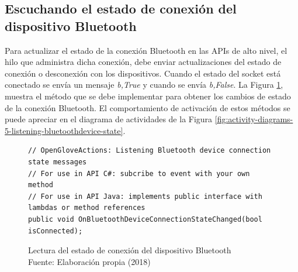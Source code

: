 \subsection{Escuchando el estado de conexión del dispositivo Bluetooth}
\label{subsection:reading-bluetooth-device-state}

Para actualizar el estado de la conexión Bluetooth en las APIs de alto nivel, el hilo que administra dicha conexión, debe enviar  actualizaciones del estado de conexión o desconexión con los dispositivos. Cuando el estado del socket está conectado se envía un mensaje  \textit{b,True}  y cuando se envía \textit{b,False}. La Figura \ref{fig:methods-5-listening-bluetoothdevice-state}, muestra el método que se debe implementar para obtener los cambios de estado de la conexión Bluetooth.  El comportamiento de activación de estos métodos se puede apreciar en el diagrama de actividades de la Figura \ref{fig:activity-diagrams-5-listening-bluetoothdevice-state}.

\begin{figure}[H]
  \begin{center}
\begin{lstlisting}
// OpenGloveActions: Listening Bluetooth device connection state messages
// For use in API C#: subcribe to event with your own method
// For use in API Java: implements public interface with lambdas or method references
public void OnBluetoothDeviceConnectionStateChanged(bool isConnected);
\end{lstlisting}
   	\captionsetup{justification=centering}
    \caption[Lectura del estado de conexión del dispositivo Bluetooth]{Lectura del estado de conexión del dispositivo Bluetooth\\Fuente: Elaboración propia (2018)}
    \label{fig:methods-5-listening-bluetoothdevice-state}
  \end{center}
\end{figure}

